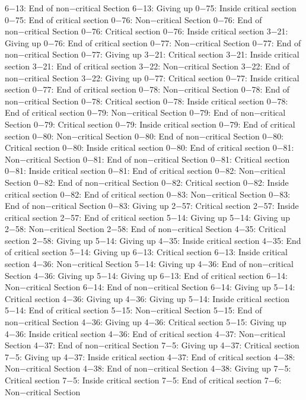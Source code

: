 6−13: End of non−critical Section
6−13: Giving up
0−75: Inside critical section
0−75: End of critical section
0−76: Non−critical Section
0−76: End of non−critical Section
0−76: Critical section
0−76: Inside critical section
3−21: Giving up
0−76: End of critical section
0−77: Non−critical Section
0−77: End of non−critical Section
0−77: Giving up
3−21: Critical section
3−21: Inside critical section
3−21: End of critical section
3−22: Non−critical Section
3−22: End of non−critical Section
3−22: Giving up
0−77: Critical section
0−77: Inside critical section
0−77: End of critical section
0−78: Non−critical Section
0−78: End of non−critical Section
0−78: Critical section
0−78: Inside critical section
0−78: End of critical section
0−79: Non−critical Section
0−79: End of non−critical Section
0−79: Critical section
0−79: Inside critical section
0−79: End of critical section
0−80: Non−critical Section
0−80: End of non−critical Section
0−80: Critical section
0−80: Inside critical section
0−80: End of critical section
0−81: Non−critical Section
0−81: End of non−critical Section
0−81: Critical section
0−81: Inside critical section
0−81: End of critical section
0−82: Non−critical Section
0−82: End of non−critical Section
0−82: Critical section
0−82: Inside critical section
0−82: End of critical section
0−83: Non−critical Section
0−83: End of non−critical Section
0−83: Giving up
2−57: Critical section
2−57: Inside critical section
2−57: End of critical section
5−14: Giving up
5−14: Giving up
2−58: Non−critical Section
2−58: End of non−critical Section
4−35: Critical section
2−58: Giving up
5−14: Giving up
4−35: Inside critical section
4−35: End of critical section
5−14: Giving up
6−13: Critical section
6−13: Inside critical section
4−36: Non−critical Section
5−14: Giving up
4−36: End of non−critical Section
4−36: Giving up
5−14: Giving up
6−13: End of critical section
6−14: Non−critical Section
6−14: End of non−critical Section
6−14: Giving up
5−14: Critical section
4−36: Giving up
4−36: Giving up
5−14: Inside critical section
5−14: End of critical section
5−15: Non−critical Section
5−15: End of non−critical Section
4−36: Giving up
4−36: Critical section
5−15: Giving up
4−36: Inside critical section
4−36: End of critical section
4−37: Non−critical Section
4−37: End of non−critical Section
7−5: Giving up
4−37: Critical section
7−5: Giving up
4−37: Inside critical section
4−37: End of critical section
4−38: Non−critical Section
4−38: End of non−critical Section
4−38: Giving up
7−5: Critical section
7−5: Inside critical section
7−5: End of critical section
7−6: Non−critical Section
